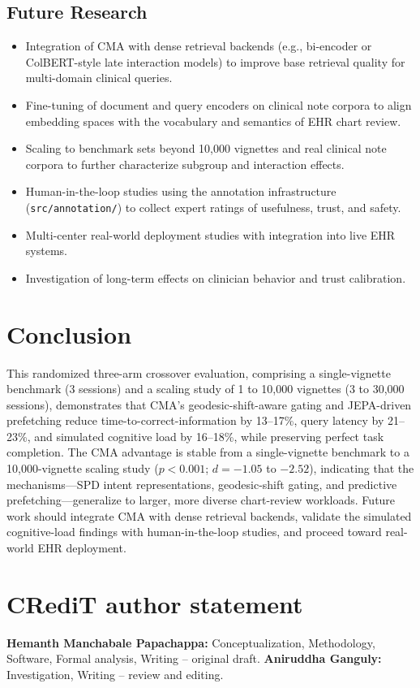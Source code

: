 \documentclass[preprint,12pt]{elsarticle}
\begin{document}
\subsection{Future Research}
\begin{itemize}
  \item Integration of CMA with dense retrieval backends (e.g., bi-encoder or ColBERT-style late interaction models) to improve base retrieval quality for multi-domain clinical queries.
  \item Fine-tuning of document and query encoders on clinical note corpora to align embedding spaces with the vocabulary and semantics of EHR chart review.
  \item Scaling to benchmark sets beyond 10{,}000 vignettes and real clinical note corpora to further characterize subgroup and interaction effects.
  \item Human-in-the-loop studies using the annotation infrastructure (\texttt{src/annotation/}) to collect expert ratings of usefulness, trust, and safety.
  \item Multi-center real-world deployment studies with integration into live EHR systems.
  \item Investigation of long-term effects on clinician behavior and trust calibration.
\end{itemize}

\section{Conclusion}

This randomized three-arm crossover evaluation, comprising a single-vignette benchmark (3 sessions) and a scaling study of 1 to 10{,}000 vignettes (3 to 30{,}000 sessions), demonstrates that CMA's geodesic-shift-aware gating and JEPA-driven prefetching reduce time-to-correct-information by 13--17\%, query latency by 21--23\%, and simulated cognitive load by 16--18\%, while preserving perfect task completion. The CMA advantage is stable from a single-vignette benchmark to a 10{,}000-vignette scaling study ($p < 0.001$; $d = -1.05$ to $-2.52$), indicating that the mechanisms---SPD intent representations, geodesic-shift gating, and predictive prefetching---generalize to larger, more diverse chart-review workloads. Future work should integrate CMA with dense retrieval backends, validate the simulated cognitive-load findings with human-in-the-loop studies, and proceed toward real-world EHR deployment.

\section*{CRediT author statement}
\textbf{Hemanth Manchabale Papachappa:} Conceptualization, Methodology, Software, Formal analysis, Writing -- original draft. \textbf{Aniruddha Ganguly:}  Investigation, Writing -- review and editing.
\end{document}
